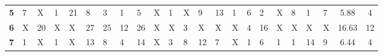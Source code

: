 \begin{table}[t]
\begin{adjustbox}{width=\textwidth}
\begin{tabular}{|c|llllllllllllllllllll|c|c|}
\textbf{5}           & {\color{blue} 7}  & {\color{red} X} & {\color{blue} 1}                      & {\color{blue} 21}                     & {\color{blue} 8}                      & {\color{blue} 3}                      & {\color{blue} 1}  & {\color{blue} 5}                      & {\color{red} X} & {\color{blue} 1}                      & {\color{red} X} & {\color{blue} 9}                      & {\color{blue} 13}                     & {\color{blue} 1}                      & {\color{blue} 6}                      & {\color{blue} 2}                      & {\color{red} X} & {\color{blue} 8}                      & {\color{blue} 1}                      & {\color{blue} 7}                      & 5.88                                                & 4                                                   \\
\textbf{6}           & {\color{red} X}  & {\color{blue} 20}                     & {\color{red} X} & {\color{red} X} & {\color{blue} 27}                     & {\color{blue} 25}                     & {\color{blue} 12} & {\color{blue} 26}                     & {\color{red} X} & {\color{red} X} & {\color{blue} 3}                      & {\color{red} X} & {\color{red} X} & {\color{red} X} & {\color{blue} 4}                      & {\color{blue} 16}                     & {\color{red} X} & {\color{red} X} & {\color{red} X} & {\color{red} X} & 16.63                                               & 12                                                  \\
\textbf{7}           & {\color{blue} 1}  & {\color{red} X} & {\color{blue} 1}                      & {\color{red} X} & {\color{blue} 13}                     & {\color{blue} 8}                      & {\color{blue} 4}  & {\color{blue} 14}                     & {\color{red} X} & {\color{blue} 3}                      & {\color{blue} 8}                      & {\color{blue} 12}                     & {\color{blue} 7}                      & {\color{red} X} & {\color{blue} 1}                      & {\color{blue} 6}                      & {\color{blue} 1}                      & {\color{blue} 1}                      & {\color{blue} 14}                     & {\color{blue} 9}                      & 6.44                                                & 4                                                   \\

\end{tabular}
\end{adjustbox}
\end{table}
